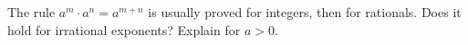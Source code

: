 The rule $a^m\cdot a^n=a^{m+n}$ is usually proved for integers, then for rationals. Does it hold for irrational exponents? Explain for $a>0$.
